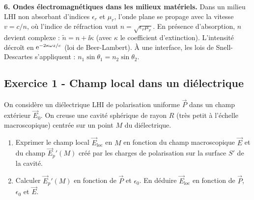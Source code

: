 \documentclass[12pt,a4paper]{article}
\begin{document}
\begin{boiteresume}
\textbf{6. Ondes électromagnétiques dans les milieux matériels.}
Dans un milieu LHI non absorbant d'indices $\epsilon_r$ et $\mu_r$, l'onde plane se propage avec la vitesse $v = c/n$, où l'indice de réfraction vaut $n = \sqrt{\epsilon_r\mu_r}$. En présence d'absorption, $n$ devient complexe : $\tilde{n} = n + \ii\kappa$ (avec $\kappa$ le coefficient d'extinction). L'intensité décroît en $\mathrm{e}^{-2\kappa\omega z/c}$ (loi de Beer-Lambert). À une interface, les lois de Snell-Descartes s'appliquent : $n_1\sin\theta_1 = n_2\sin\theta_2$.

\end{boiteresume}

\newpage
\subsection*{Exercice 1 - Champ local dans un diélectrique \niveau{\moyen}}

\begin{boiteexercice}
On considère un diélectrique LHI de polarisation uniforme $\vec{P}$ dans un champ extérieur $\vec{E}_0$. On creuse une cavité sphérique de rayon $R$ (très petit à l'échelle macroscopique) centrée sur un point $M$ du diélectrique.
\begin{enumerate}
  \item Exprimer le champ local $\vec{E}_\text{loc}$ en $M$ en fonction du champ macroscopique $\vec{E}$ et du champ $\vec{E}_p'(M)$ créé par les charges de polarisation sur la surface $S'$ de la cavité.
  \item Calculer $\vec{E}_p'(M)$ en fonction de $\vec{P}$ et $\epsilon_0$. En déduire $\vec{E}_\text{loc}$ en fonction de $\vec{P}$, $\epsilon_0$ et $\vec{E}$.
\end{enumerate}
\end{boiteexercice}
\end{document}
